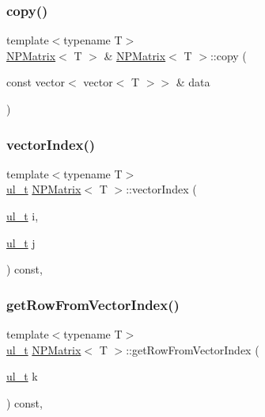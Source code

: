 \subsubsection{\texorpdfstring{copy()}{copy()}\hspace{0.1cm}{\footnotesize\ttfamily [2/2]}}
{\footnotesize\ttfamily template$<$typename T$>$ \\
\mbox{\hyperlink{class_n_p_matrix}{N\+P\+Matrix}}$<$ T $>$ \& \mbox{\hyperlink{class_n_p_matrix}{N\+P\+Matrix}}$<$ T $>$\+::copy (\begin{DoxyParamCaption}\item[{const vector$<$ vector$<$ T $>$$>$ \&}]{data }\end{DoxyParamCaption})\hspace{0.3cm}{\ttfamily [protected]}}

\mbox{\label{class_n_p_matrix_a1edc980b44c5b898ba3feb7d4f5ab625}} 
\subsubsection{\texorpdfstring{vectorIndex()}{vectorIndex()}}
{\footnotesize\ttfamily template$<$typename T$>$ \\
\mbox{\hyperlink{group___n_algebra_ga1b140a2034db3f5dfe18a987745df43a}{ul\+\_\+t}} \mbox{\hyperlink{class_n_p_matrix}{N\+P\+Matrix}}$<$ T $>$\+::vector\+Index (\begin{DoxyParamCaption}\item[{\mbox{\hyperlink{group___n_algebra_ga1b140a2034db3f5dfe18a987745df43a}{ul\+\_\+t}}}]{i,  }\item[{\mbox{\hyperlink{group___n_algebra_ga1b140a2034db3f5dfe18a987745df43a}{ul\+\_\+t}}}]{j }\end{DoxyParamCaption}) const\hspace{0.3cm}{\ttfamily [inline]}, {\ttfamily [protected]}}

\mbox{\label{class_n_p_matrix_aa8f30ca3523d088186e8320f9e21b772}} 
\subsubsection{\texorpdfstring{getRowFromVectorIndex()}{getRowFromVectorIndex()}}
{\footnotesize\ttfamily template$<$typename T$>$ \\
\mbox{\hyperlink{group___n_algebra_ga1b140a2034db3f5dfe18a987745df43a}{ul\+\_\+t}} \mbox{\hyperlink{class_n_p_matrix}{N\+P\+Matrix}}$<$ T $>$\+::get\+Row\+From\+Vector\+Index (\begin{DoxyParamCaption}\item[{\mbox{\hyperlink{group___n_algebra_ga1b140a2034db3f5dfe18a987745df43a}{ul\+\_\+t}}}]{k }\end{DoxyParamCaption}) const\hspace{0.3cm}{\ttfamily [inline]}, {\ttfamily [protected]}}

